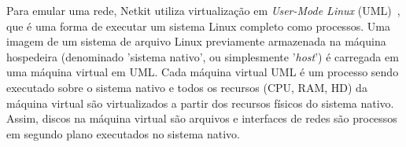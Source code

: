 \documentclass[	12pt, Times, openright, twoside, a4paper, english, brazil]{abntex2}
\begin{document}

Para emular uma rede, Netkit utiliza virtualização em \textit{User-Mode Linux} (UML)~\cite{umldike2001}, que é uma forma de executar um sistema Linux completo como processos. Uma imagem de um sistema de arquivo Linux previamente armazenada na máquina hospedeira (denominado 'sistema nativo', ou simplesmente '\textit{host}') é carregada em uma máquina virtual em UML. Cada máquina virtual UML é um processo sendo executado sobre o sistema nativo e todos os recursos (CPU, RAM, HD) da máquina virtual são virtualizados a partir dos recursos físicos do sistema nativo. Assim, discos na máquina virtual são arquivos e interfaces de redes são processos em segundo plano executados no sistema nativo.


\end{document}
